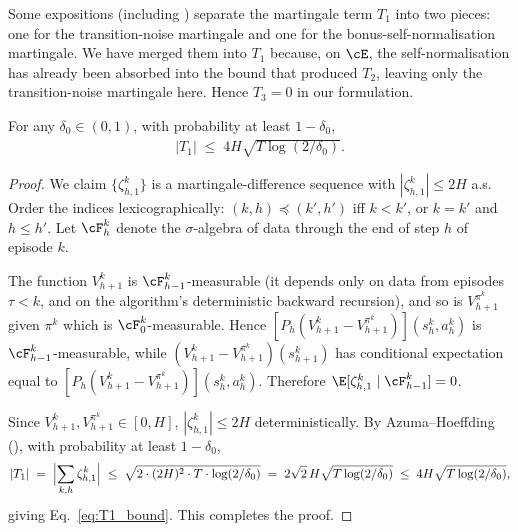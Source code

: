 \begin{remark}\label{rem:T1_T3_separation}
Some expositions (including \cite{jin2020provably}) separate the martingale term $T_1$ into two pieces: one for the transition-noise martingale and one for the bonus-self-normalisation martingale. We have merged them into $T_1$ because, on $\cE$, the self-normalisation has already been absorbed into the bound  that produced $T_2$, leaving only the transition-noise martingale here. Hence $T_3 = 0$ in our formulation.
\end{remark}

\begin{lemma}\label{lem:azuma_mds}
For any $\delta_0 \in (0, 1)$, with probability at least $1 - \delta_0$,
\begin{align}\label{eq:T1_bound}
|T_1| \;\le\; 4 H \sqrt{T \log(2 / \delta_0)}.
\end{align}
\end{lemma}

\begin{proof}
We claim $\{\zeta_{h, 1}^k\}$ is a martingale-difference sequence with $|\zeta_{h, 1}^k| \le 2 H$ a.s. Order the indices lexicographically: $(k, h) \preceq (k', h')$ iff $k < k'$, or $k = k'$ and $h \le h'$. Let $\cF_{h}^k$ denote the $\sigma$-algebra of data through the end of step $h$ of episode $k$.

The function $V_{h+1}^k$ is $\cF_{h-1}^k$-measurable (it depends only on data from episodes $\tau < k$, and on the algorithm's deterministic backward recursion), and so is $V_{h+1}^{\pi^k}$ given $\pi^k$ which is $\cF_0^k$-measurable. Hence $[P_h(V_{h+1}^k - V_{h+1}^{\pi^k})](s_h^k, a_h^k)$ is $\cF_{h-1}^k$-measurable, while $(V_{h+1}^k - V_{h+1}^{\pi^k})(s_{h+1}^k)$ has conditional expectation equal to $[P_h(V_{h+1}^k - V_{h+1}^{\pi^k})](s_h^k, a_h^k)$. Therefore $\E[\zeta_{h, 1}^k \mid \cF_{h-1}^k] = 0$.

Since $V_{h+1}^k, V_{h+1}^{\pi^k} \in [0, H]$, $|\zeta_{h, 1}^k| \le 2 H$ deterministically. By Azuma--Hoeffding (\cite{azuma1967weighted}), with probability at least $1 - \delta_0$,
\begin{align*}
|T_1| \;=\; \Bigl|\sum_{k, h} \zeta_{h, 1}^k\Bigr|
\;\le\; \sqrt{2 \cdot (2H)^2 \cdot T \cdot \log(2/\delta_0)}
\;=\; 2 \sqrt{2} \, H \sqrt{T \log(2/\delta_0)}
\;\le\; 4 H \sqrt{T \log(2/\delta_0)},
\end{align*}
giving Eq.~\eqref{eq:T1_bound}. This completes the proof.
\end{proof}
